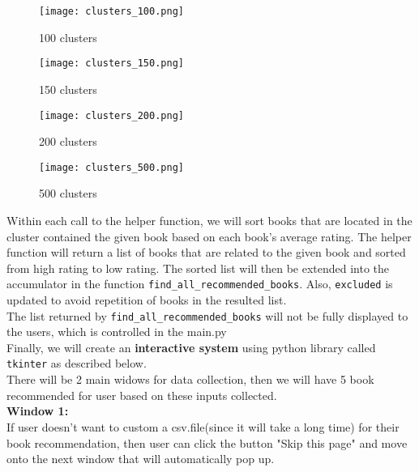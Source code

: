 \documentclass[fontsize=11pt]{article}
\begin{document}
\begin{figure}[h]
   \begin{minipage}{0.23\textwidth}
     \centering
     \texttt{[image: clusters\_100.png]}
     \caption{100 clusters}\label{Fig:Data1}
   \end{minipage}\hfill
   \begin{minipage}{0.23\textwidth}
     \centering
     \texttt{[image: clusters\_150.png]}
     \caption{150 clusters}\label{Fig:Data2}
   \end{minipage}
   \begin{minipage}{0.23\textwidth}
     \centering
     \texttt{[image: clusters\_200.png]}
     \caption{200 clusters}\label{Fig:Data1}
   \end{minipage}\hfill
   \begin{minipage}{0.23\textwidth}
     \centering
     \texttt{[image: clusters\_500.png]}
     \caption{500 clusters}\label{Fig:Data2}
   \end{minipage}

\end{figure}

Within each call to the helper function, we will sort books that are located in the cluster contained the given book based on each book's average rating. The helper function will return a list of books that are related to the given book and sorted from high rating to low rating. The sorted list will then be extended into the accumulator in the function \texttt{find\_all\_recommended\_books}. Also, \texttt{excluded} is updated to avoid repetition of books in the resulted list.\\

The list returned by \texttt{find\_all\_recommended\_books} will not be fully displayed to the users, which is controlled in the main.py\\


Finally, we will create an \textbf{interactive system} using python library called \texttt{tkinter} as described below.\\
There will be 2 main widows for data collection, then we will have 5 book recommended for user based on these inputs collected.\\

\textbf{Window 1:}\\

If user doesn't want to custom a csv.file(since it will take a long time) for their book recommendation, then user can click the button "Skip this page" and move onto the next window that will automatically pop up.\\
\end{document}
